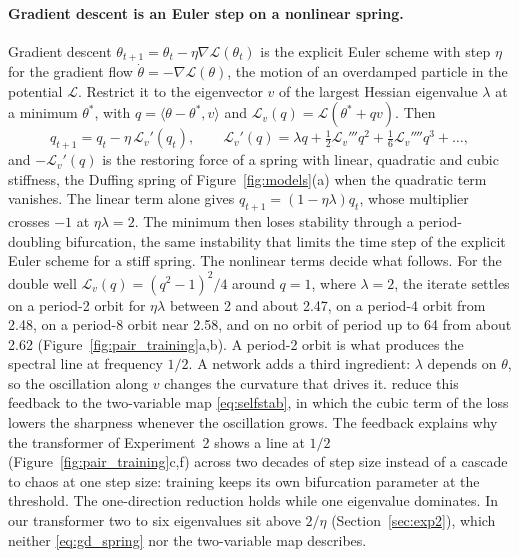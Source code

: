 \paragraph{Gradient descent is an Euler step on a nonlinear spring.} Gradient descent $\theta_{t+1}=\theta_t-\eta\nabla\mathcal L(\theta_t)$ is the explicit Euler scheme with step $\eta$ for the gradient flow $\dot\theta=-\nabla\mathcal L(\theta)$, the motion of an overdamped particle in the potential $\mathcal L$. Restrict it to the eigenvector $v$ of the largest Hessian eigenvalue $\lambda$ at a minimum $\theta^\ast$, with $q=\langle\theta-\theta^\ast,v\rangle$ and $\mathcal L_v(q)=\mathcal L(\theta^\ast+qv)$. Then
\begin{equation}
q_{t+1}=q_t-\eta\,\mathcal L_v'(q_t),\qquad \mathcal L_v'(q)=\lambda q+\tfrac12\mathcal L_v'''q^2+\tfrac16\mathcal L_v''''q^3+\dots,
\label{eq:gd_spring}
\end{equation}
and $-\mathcal L_v'(q)$ is the restoring force of a spring with linear, quadratic and cubic stiffness, the Duffing spring of Figure~\ref{fig:models}(a) when the quadratic term vanishes. The linear term alone gives $q_{t+1}=(1-\eta\lambda)q_t$, whose multiplier crosses $-1$ at $\eta\lambda=2$. The minimum then loses stability through a period-doubling bifurcation, the same instability that limits the time step of the explicit Euler scheme for a stiff spring. The nonlinear terms decide what follows. For the double well $\mathcal L_v(q)=(q^2-1)^2/4$ around $q=1$, where $\lambda=2$, the iterate settles on a period-2 orbit for $\eta\lambda$ between 2 and about 2.47, on a period-4 orbit from 2.48, on a period-8 orbit near 2.58, and on no orbit of period up to 64 from about 2.62 (Figure~\ref{fig:pair_training}a,b). A period-2 orbit is what produces the spectral line at frequency $1/2$. A network adds a third ingredient: $\lambda$ depends on $\theta$, so the oscillation along $v$ changes the curvature that drives it. \citet{damian2022selfstabilization} reduce this feedback to the two-variable map \eqref{eq:selfstab}, in which the cubic term of the loss lowers the sharpness whenever the oscillation grows. The feedback explains why the transformer of Experiment~2 shows a line at $1/2$ (Figure~\ref{fig:pair_training}c,f) across two decades of step size instead of a cascade to chaos at one step size: training keeps its own bifurcation parameter at the threshold. The one-direction reduction holds while one eigenvalue dominates. In our transformer two to six eigenvalues sit above $2/\eta$ (Section~\ref{sec:exp2}), which neither \eqref{eq:gd_spring} nor the two-variable map describes.

